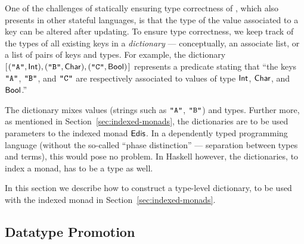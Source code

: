 One of the challenges of statically ensuring type correctness of \Redis{},
which also presents in other stateful languages, is that the type of the value
associated to a key can be altered after updating. To ensure type correctness,
we keep track of the types of all existing keys in a {\em dictionary} ---
conceptually, an associate list, or a list of pairs of keys and \Redis{} types.
For example, the dictionary \ensuremath{[\mskip1.5mu (\text{\tt \char34 A\char34},\Conid{Int}),(\text{\tt \char34 B\char34},\Conid{Char}),(\text{\tt \char34 C\char34},\Conid{Bool})\mskip1.5mu]} represents
a predicate stating that ``the keys \ensuremath{\text{\tt \char34 A\char34}}, \ensuremath{\text{\tt \char34 B\char34}}, and \ensuremath{\text{\tt \char34 C\char34}} are respectively
associated to values of type \ensuremath{\Conid{Int}}, \ensuremath{\Conid{Char}}, and \ensuremath{\Conid{Bool}}.''

The dictionary mixes values (strings such as \ensuremath{\text{\tt \char34 A\char34}}, \ensuremath{\text{\tt \char34 B\char34}}) and types. Further
more, as mentioned in Section~\ref{sec:indexed-monads}, the dictionaries are
to be used parameters to the indexed monad \ensuremath{\Conid{Edis}}. In a dependently typed
programming language (without the so-called ``phase distinction'' ---
separation between types and terms), this would pose no problem. In Haskell
however, the dictionaries, to index a monad, has to be a type as well.

In this section we describe how to construct a type-level dictionary, to be
used with the indexed monad in Section~\ref{sec:indexed-monads}.

\subsection{Datatype Promotion}

